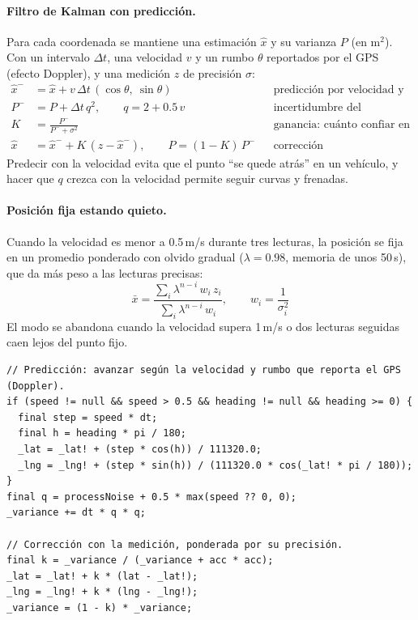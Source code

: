 \documentclass[11pt]{article}
\begin{document}
\paragraph{Filtro de Kalman con predicción.}
Para cada coordenada se mantiene una estimación $\hat{x}$ y su varianza $P$ (en m$^2$). Con un intervalo
$\Delta t$, una velocidad $v$ y un rumbo $\theta$ reportados por el GPS (efecto Doppler), y una medición $z$
de precisión $\sigma$:
\begin{align}
  \hat{x}^- &= \hat{x} + v\,\Delta t\,(\cos\theta,\ \sin\theta) && \text{predicción por velocidad y rumbo}\\
  P^- &= P + \Delta t\, q^2, \qquad q = 2 + 0.5\,v && \text{incertidumbre del movimiento}\\
  K &= \frac{P^-}{P^- + \sigma^2} && \text{ganancia: cuánto confiar en la medición}\\
  \hat{x} &= \hat{x}^- + K\,(z - \hat{x}^-), \qquad P = (1-K)\,P^- && \text{corrección}
\end{align}
Predecir con la velocidad evita que el punto ``se quede atrás'' en un vehículo, y hacer que $q$ crezca con
la velocidad permite seguir curvas y frenadas.

\paragraph{Posición fija estando quieto.}
Cuando la velocidad es menor a 0.5\,m/s durante tres lecturas, la posición se fija en un promedio ponderado
con olvido gradual ($\lambda = 0.98$, memoria de unos 50\,s), que da más peso a las lecturas precisas:
\begin{equation}
  \bar{x} = \frac{\sum_i \lambda^{n-i}\, w_i\, z_i}{\sum_i \lambda^{n-i}\, w_i}, \qquad w_i = \frac{1}{\sigma_i^2}
\end{equation}
El modo se abandona cuando la velocidad supera 1\,m/s o dos lecturas seguidas caen lejos del punto fijo.

\begin{lstlisting}[caption={Núcleo del filtro de Kalman (Dart).}]
// Predicción: avanzar según la velocidad y rumbo que reporta el GPS (Doppler).
if (speed != null && speed > 0.5 && heading != null && heading >= 0) {
  final step = speed * dt;
  final h = heading * pi / 180;
  _lat = _lat! + (step * cos(h)) / 111320.0;
  _lng = _lng! + (step * sin(h)) / (111320.0 * cos(_lat! * pi / 180));
}
final q = processNoise + 0.5 * max(speed ?? 0, 0);
_variance += dt * q * q;

// Corrección con la medición, ponderada por su precisión.
final k = _variance / (_variance + acc * acc);
_lat = _lat! + k * (lat - _lat!);
_lng = _lng! + k * (lng - _lng!);
_variance = (1 - k) * _variance;
\end{lstlisting}
\end{document}
